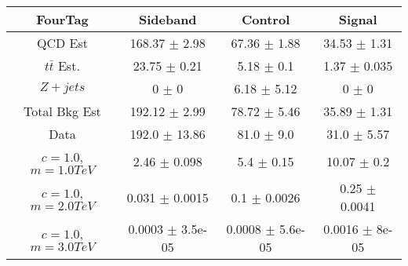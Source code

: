 \begin{footnotesize} 
\begin{tabular}{c|c|c|c} 
FourTag & Sideband & Control & Signal \\ 
\hline\hline 
QCD Est & 168.37 $\pm$ 2.98 & 67.36 $\pm$ 1.88 & 34.53 $\pm$ 1.31\\ 
$t\bar{t}$ Est.  & 23.75 $\pm$ 0.21 & 5.18 $\pm$ 0.1 & 1.37 $\pm$ 0.035\\ 
$Z+jets$ & 0 $\pm$ 0 & 6.18 $\pm$ 5.12 & 0 $\pm$ 0\\ 
Total Bkg Est & 192.12 $\pm$ 2.99 & 78.72 $\pm$ 5.46 & 35.89 $\pm$ 1.31\\ 
Data & 192.0 $\pm$ 13.86 & 81.0 $\pm$ 9.0 & 31.0 $\pm$ 5.57\\ 
$c=1.0$,$m=1.0TeV$ & 2.46 $\pm$ 0.098 & 5.4 $\pm$ 0.15 & 10.07 $\pm$ 0.2\\ 
$c=1.0$,$m=2.0TeV$ & 0.031 $\pm$ 0.0015 & 0.1 $\pm$ 0.0026 & 0.25 $\pm$ 0.0041\\ 
$c=1.0$,$m=3.0TeV$ & 0.0003 $\pm$ 3.5e-05 & 0.0008 $\pm$ 5.6e-05 & 0.0016 $\pm$ 8e-05\\ 
\hline\hline 
\end{tabular} 
\end{footnotesize} 
\newline 

